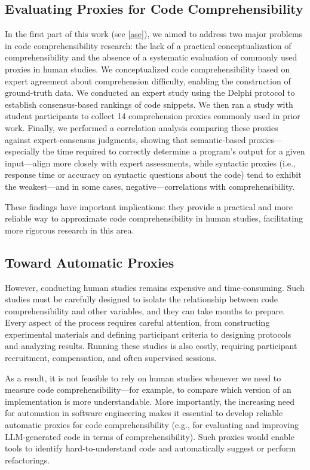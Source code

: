 \subsection{Evaluating Proxies for Code Comprehensibility}

In the first part of this work (see \cref{ase}), we aimed to address two major problems in code comprehensibility research: the lack of a practical conceptualization of comprehensibility and the absence of a systematic evaluation of commonly used proxies in human studies. We conceptualized code comprehensibility based on expert agreement about comprehension difficulty, enabling the construction of ground-truth data. We conducted an expert study using the Delphi protocol to establish consensus-based rankings of code snippets. We then ran a study with student participants to collect 14 comprehension proxies commonly used in prior work. Finally, we performed a correlation analysis comparing these proxies against expert-consensus judgments, showing that semantic-based proxies---especially the time required to correctly determine a program's output for a given input---align more closely with expert assessments, while syntactic proxies (i.e., response time or accuracy on syntactic questions about the code) tend to exhibit the weakest---and in some cases, negative---correlations with comprehensibility.

These findings have important implications: they provide a practical and more reliable way to approximate code comprehensibility in human studies, facilitating more rigorous research in this area.

\subsection{Toward Automatic Proxies}

However, conducting human studies remains expensive and time-consuming. Such studies must be carefully designed to isolate the relationship between code comprehensibility and other variables, and they can take months to prepare. Every aspect of the process requires careful attention, from constructing experimental materials and defining participant criteria to designing protocols and analyzing results. Running these studies is also costly, requiring participant recruitment, compensation, and often supervised sessions.

As a result, it is not feasible to rely on human studies whenever we need to measure code comprehensibility---for example, to compare which version of an implementation is more understandable. More importantly, the increasing need for automation in software engineering makes it essential to develop reliable automatic proxies for code comprehensibility (e.g., for evaluating and improving LLM-generated code in terms of comprehensibility). Such proxies would enable tools to identify hard-to-understand code and automatically suggest or perform refactorings.

